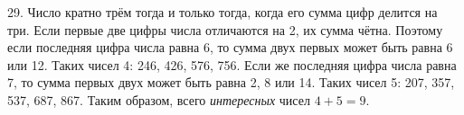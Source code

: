 29. Число кратно трём тогда и только тогда, когда его сумма цифр делится на три. Если первые две цифры числа отличаются на 2, их сумма чётна. Поэтому если последняя цифра числа равна 6, то сумма двух первых может быть равна 6 или 12. Таких чисел 4: 246, 426, 576, 756. Если же последняя цифра числа равна 7, то сумма первых двух может быть равна 2, 8 или 14. Таких чисел 5: 207, 357, 537, 687, 867. Таким образом, всего {\it интересных} чисел $4+5=9.$\\
